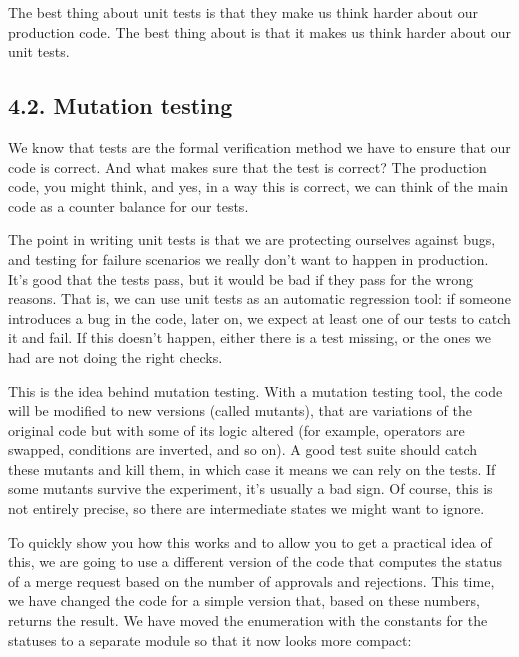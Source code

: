 \documentclass[a4paper,10pt,english]{sphinxmanual}
\begin{document}
The best thing about unit tests is that they make us think harder about our production code.
The best thing about  is that it makes us think harder about our unit tests.


\subsection{4.2. Mutation testing}
\label{\detokenize{chapters/8_unit_testing/index:mutation-testing}}
We know that tests are the formal verification method we have to ensure that our code is
correct. And what makes sure that the test is correct? The production code, you might
think, and yes, in a way this is correct, we can think of the main code as a counter balance
for our tests.

The point in writing unit tests is that we are protecting ourselves against bugs, and testing
for failure scenarios we really don’t want to happen in production. It’s good that the tests
pass, but it would be bad if they pass for the wrong reasons. That is, we can use unit tests as
an automatic regression tool: if someone introduces a bug in the code, later on, we expect
at least one of our tests to catch it and fail. If this doesn’t happen, either there is a test
missing, or the ones we had are not doing the right checks.

This is the idea behind mutation testing. With a mutation testing tool, the code will be
modified to new versions (called mutants), that are variations of the original code but with
some of its logic altered (for example, operators are swapped, conditions are inverted, and
so on). A good test suite should catch these mutants and kill them, in which case it means
we can rely on the tests. If some mutants survive the experiment, it’s usually a bad sign. Of
course, this is not entirely precise, so there are intermediate states we might want to ignore.

To quickly show you how this works and to allow you to get a practical idea of this, we are
going to use a different version of the code that computes the status of a merge request
based on the number of approvals and rejections. This time, we have changed the code for a
simple version that, based on these numbers, returns the result. We have moved the
enumeration with the constants for the statuses to a separate module so that it now looks
more compact:
\end{document}
